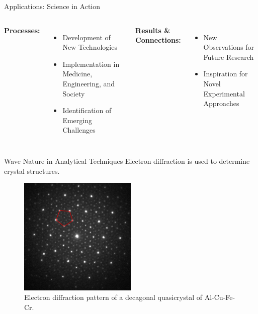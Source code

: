 \begin{frame}{Applications: Science in Action}
  \begin{columns}
    \textbf{Processes:}
    \begin{itemize}
      \item Development of New Technologies
      \item Implementation in Medicine, Engineering, and Society
      \item Identification of Emerging Challenges
    \end{itemize}

    \textbf{Results \& Connections:}
    \begin{itemize}
      \item New Observations for Future Research
      \item Inspiration for Novel Experimental Approaches
      \vspace{1.1cm}
    \end{itemize}
  \end{columns}
\end{frame}

\begin{frame}{Wave Nature in Analytical Techniques}
  Electron diffraction is used to determine crystal structures. \cite{Zhou2017}

  \vspace{0.2cm}

  \begin{figure}
    \centering
    \includegraphics[width=0.5\textwidth]{Figures/crystal.png}
    \caption{Electron diffraction pattern of a decagonal quasicrystal of Al-Cu-Fe-Cr. \cite{Ldm19542003}}
  \end{figure}
  
\end{frame}
